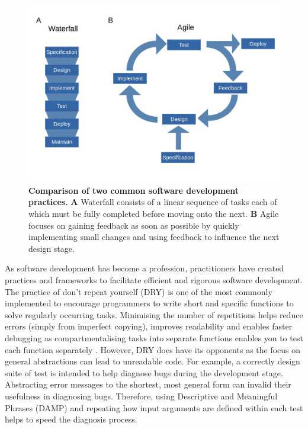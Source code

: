 \documentclass[../main.tex]{subfiles}
\begin{document}

\begin{figure}[h]

{\centering \includegraphics[width=\linewidth]{figures/agileVsWaterfall} 

}

\caption[Comparison of two common software development practices.]{\textbf{Comparison of two common software development practices.} \textbf{A} Waterfall consists of a linear sequence of tasks each of which must be fully completed before moving onto the next. \textbf{B} Agile focuses on gaining feedback as soon as possible by quickly implementing small changes and using feedback to influence the next design stage. }\label{fig:development-practices}
\end{figure}

As software development has become a profession, practitioners have created practices and frameworks to facilitate efficient and rigorous software development.
The practice of don't repeat yourself (DRY) is one of the most commonly implemented to encourage programmers to write short and specific functions to solve regularly occurring tasks. 
Minimising the number of repetitions helps reduce errors (simply from imperfect copying), improves readability and enables faster debugging as compartmentalising tasks into separate functions enables you to test each function separately \parencite{Thomas1999}.
However, DRY does have its opponents as the focus on general abstractions can lead to unreadable code.
For example, a correctly design suite of test is intended to help diagnose bugs during the development stage.
Abstracting error messages to the shortest, most general form can invalid their usefulness in diagnosing bugs.
Therefore, using Descriptive and Meaningful Phrases (DAMP) and repeating how input arguments are defined within each test helps to speed the diagnosis process.
\end{document}

